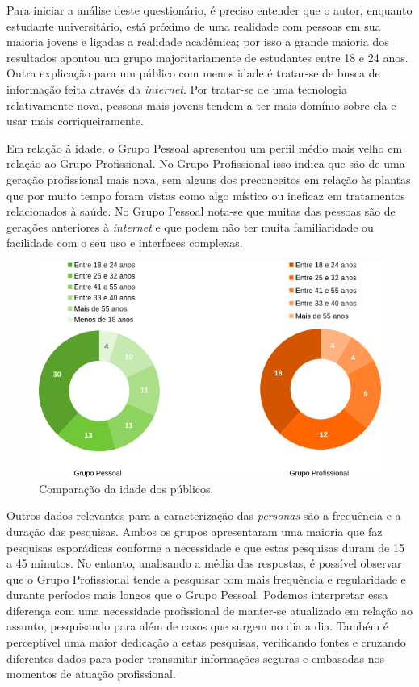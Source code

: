 Para iniciar a análise deste questionário, é preciso entender que o autor, enquanto estudante universitário, está próximo de uma realidade com pessoas em sua maioria jovens e ligadas a realidade acadêmica; por isso a grande maioria dos resultados apontou um grupo majoritariamente de estudantes entre 18 e 24 anos. Outra explicação para um público com menos idade é tratar-se de busca de informação feita através da \emph{internet}. Por tratar-se de uma tecnologia relativamente nova, pessoas mais jovens tendem a ter mais domínio sobre ela e usar mais corriqueiramente.

Em relação à idade, o Grupo Pessoal apresentou um perfil médio mais velho em relação ao Grupo Profissional. No Grupo Profissional isso indica que são de uma geração profissional mais nova, sem alguns dos preconceitos em relação às plantas que por muito tempo foram vistas como algo místico ou ineficaz em tratamentos relacionados à saúde. No Grupo Pessoal nota-se que muitas das pessoas são de gerações anteriores à \emph{internet} e que podem não ter muita familiaridade ou facilidade com o seu uso e interfaces complexas.

\begin{figure}[!htbp]
\centering
\caption{\label{graf-idade}Comparação da idade dos públicos.}
\includegraphics[width=\textwidth]{images/idade.png}
\end{figure}


Outros dados relevantes para a caracterização das \emph{personas} são a frequência e a duração das pesquisas. Ambos os grupos apresentaram uma maioria que faz pesquisas esporádicas conforme a necessidade e que estas pesquisas duram de 15 a 45 minutos. No entanto, analisando a média das respostas, é possível observar que o Grupo Profissional tende a pesquisar com mais frequência e regularidade e durante períodos mais longos que o Grupo Pessoal. Podemos interpretar essa diferença com uma necessidade profissional de manter-se atualizado em relação ao assunto, pesquisando para além de casos que surgem no dia a dia. Também é perceptível uma maior dedicação a estas pesquisas, verificando fontes e cruzando diferentes dados para poder transmitir informações seguras e embasadas nos momentos de atuação profissional.

